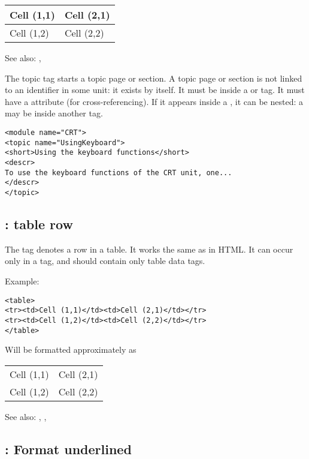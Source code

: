 \begin{tabular}{ll}
Cell (1,1) & Cell (2,1) \\ \hline
Cell (1,2) & Cell (2,2)
\end{tabular}
 
See also: , 

\label{tag:topic}
The topic tag starts a topic page or section. A topic page or section is
not linked to an identifier in some unit: it exists by itself. It must be 
inside a  or  tag. It must have a 
attribute (for cross-referencing). If it appears inside a , 
it can be nested: a  may be inside another  tag.

\begin{verbatim}
<module name="CRT">
<topic name="UsingKeyboard">
<short>Using the keyboard functions</short>
<descr>
To use the keyboard functions of the CRT unit, one...
</descr>
</topic>
\end{verbatim}

\subsection{ : table row}
\label{tag:tr}
The  tag denotes a row in a table. It works the same as in HTML.
It can occur only in a  tag, and should contain only 
table data tags. 

Example:
\begin{verbatim}
<table>
<tr><td>Cell (1,1)</td><td>Cell (2,1)</td></tr>
<tr><td>Cell (1,2)</td><td>Cell (2,2)</td></tr>
</table>
\end{verbatim}
Will be formatted approximately as

\begin{tabular}{ll}
Cell (1,1) & Cell (2,1) \\
Cell (1,2) & Cell (2,2)
\end{tabular}

See also: , , 

\subsection{ : Format underlined}
\label{tag:u}

